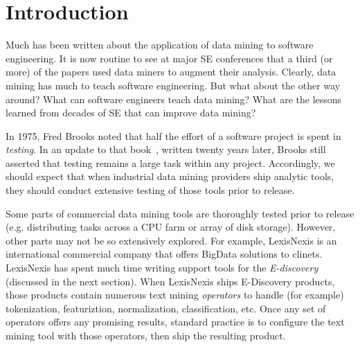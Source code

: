 \documentclass{sig-alternate-05-2015}
\theoremstyle{break}
\begin{document}
\section{Introduction}


Much has been written about the application of data mining
to software engineering. It is now routine to see at major SE
conferences that a third (or more) of the papers used data miners
to augment their analysis.
Clearly, data mining has much to teach software engineering.
But what about the other way around? What can software engineers teach
data mining? What are the lessons learned from decades of SE that
can improve data mining?

In 1975, Fred Brooks noted that half the effort 
of a software project is spent in {\em testing}. In an update
to that book~\cite{Brooks95}, written twenty years later, Brooks still
asserted that testing remains a large task within any project.
Accordingly, we should expect that when industrial data mining
providers ship analytic tools, they should conduct extensive
testing of those tools prior to release.


Some parts of commercial data mining tools are thoroughly tested prior to
release (e.g. distributing tasks across
a CPU farm or array of disk storage). However, other parts
may not be so extensively explored. For example, 
LexisNexis  is an international commercial company that offers
BigData solutions to clinets. LexisNexis has
spent much time writing support tools for the {\em E-discovery} (discussed
in the next section).  
When LexisNexis ships E-Discovery products, those products contain
numerous text mining {\em operators} to handle (for example)
tokenization, featuriztion, normalization, classification, etc. 
Once any set of operators offers any promising results,
standard practice is to configure the text mining tool
with those operators, then ship the resulting product.
\end{document}
